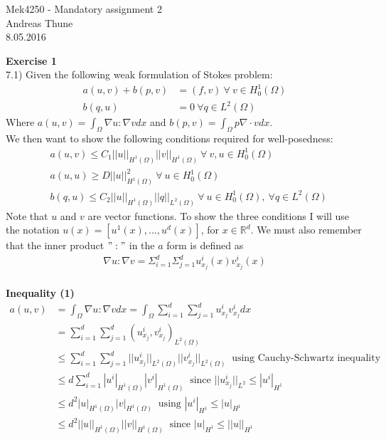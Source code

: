 \documentclass[11pt,a4paper]{report}
\begin{document}
\begin{center}

\LARGE Mek4250 - Mandatory assignment 2
\\
Andreas Thune
\\
\LARGE
8.05.2016

\end{center}
\textbf{Exercise 1}
\\
7.1) Given the following weak formulation of Stokes problem:
\begin{align*}
a(u,v)+b(p,v)&=(f,v) \ \forall \ v \in H_0^1(\Omega)\\
b(q,u)&=0 \ \forall q \in L^2(\Omega)
\end{align*}
Where $a(u,v) = \int_{\Omega}\nabla u : \nabla v dx$ and $b(p,v) =\int_{\Omega} p\nabla \cdot v dx$.
\\
We then want to show the following conditions required for well-posedness:
\begin{align}
&a(u,v) \leq C_1 ||u||_{H^1(\Omega)}||v||_{H^1(\Omega)} \ \forall \ v,u \in H_0^1(\Omega)\\
&a(u,u) \geq D||u||_{H^1(\Omega)}^2 \ \forall \ u \in H_0^1(\Omega)\\
&b(q,u) \leq C_2||u||_{H^1(\Omega)}||q||_{L^2(\Omega)} \ \forall \ u \in H_0^1(\Omega), \ \forall q \in L^2(\Omega)
\end{align}
Note that $u$ and $v$ are vector functions. To show the three conditions I will use the notation $u(x)=[u^1(x),...,u^d(x)]$, for $x \in  \mathbb{R}^d$. We must also remember that the inner product $":"$ in the $a$ form is defined as 
\begin{align*}
\nabla u : \nabla v = \Sigma_{i=1}^d\Sigma_{j=1}^d u_{x_j}^i(x)v_{x_j}^i(x)
\end{align*}
\\
\textbf{Inequality (1)}
\\
\begin{align*}
a(u,v)&= \int_{\Omega}\nabla u : \nabla v dx=\int_{\Omega}\sum_{i=1}^d\sum_{j=1}^d u_{x_j}^iv_{x_j}^idx \\
&=\sum_{i=1}^d\sum_{j=1}^d (u_{x_j}^i,v_{x_j}^i)_{L^2(\Omega)} \\
&\leq \sum_{i=1}^d\sum_{j=1}^d ||u_{x_j}^i||_{L^2(\Omega)}||v_{x_j}^i||_{L^2(\Omega)} \ \text{  using Cauchy-Schwartz inequality}  \\
&\leq d \sum_{i=1}^d |u^i|_{H^1(\Omega)}|v^i|_{H^1(\Omega)} \ \text{ since $||u_{x_j}^i||_{L^2} \leq |u^i|_{H^1}$} \\
&\leq d^2 |u|_{H^1(\Omega)}|v|_{H^1(\Omega)} \ \text{        using $|u^i|_{H^1} \leq |u|_{H^1}$} \\
&\leq d^2 ||u||_{H^1(\Omega)}||v||_{H^1(\Omega)} \ \text{    since $|u|_{H^1}\leq ||u||_{H^1}$ } 
\end{align*}
\end{document}
